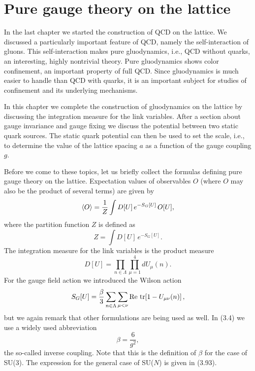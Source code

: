
\chapter{Pure gauge theory on the lattice}

In the last chapter we started the construction of QCD on the lattice. We
discussed a particularly important feature of QCD, namely the self-interaction
of gluons. This self-interaction makes pure gluodynamics, i.e., QCD without
quarks, an interesting, highly nontrivial theory. Pure gluodynamics shows color
confinement, an important property of full QCD. Since gluodynamics is much
easier to handle than QCD with quarks, it is an important subject for studies
of confinement and its underlying mechanisms.

In this chapter we complete the construction of gluodynamics on the lattice by
discussing the integration measure for the link variables. After a section about
gauge invariance and gauge fixing we discuss the potential between two static
quark sources. The static quark potential can then be used to set the scale,
i.e., to determine the value of the lattice spacing $a$ as a function of the
gauge coupling $g$.

Before we come to these topics, let us briefly collect the formulas defining
pure gauge theory on the lattice. Expectation values of observables $O$ (where
$O$ may also be the product of several terms) are given by
\begin{equation}
  \left\langle O \right\rangle = \frac{1}{Z}\int D[U]\,e^{-S_G[U]}\,O[U],
\end{equation}
where the partition function $Z$ is defined as
\begin{equation}
  Z = \int D[U]\,e^{-S_G[U]}.
\end{equation}
The integration measure for the link variables is the product measure
\begin{equation}
  D[U] = \prod_{n\in\Lambda}\prod_{\mu=1}^{4} dU_\mu(n).
\end{equation}
For the gauge field action we introduced the Wilson action
\begin{equation}
  S_G[U] = \frac{\beta}{3}\sum_{n\in\Lambda}\sum_{\mu<\nu}
           \operatorname{Re}\,\operatorname{tr}\!\left[1 - U_{\mu\nu}(n)\right],
\end{equation}
but we again remark that other formulations are being used as well. In (3.4) we
use a widely used abbreviation
\begin{equation}
  \beta = \frac{6}{g^2},
\end{equation}
the so-called inverse coupling. Note that this is the definition of $\beta$ for
the case of SU(3). The expression for the general case of SU($N$) is given in
(3.93).

